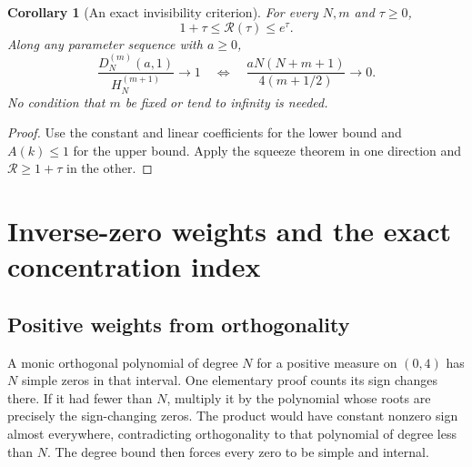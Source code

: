 \documentclass[11pt,a4paper]{article}
\numberwithin{equation}{section}
\newtheorem{corollary}[theorem]{Corollary}
\theoremstyle{definition}
\theoremstyle{remark}
\newcommand{\dd}{\mathrm d}
\newcommand{\Rgs}{\mathcal R}
\begin{document}
\noindent[Merge note: \eqref{gs:eq:repository-coeff} is Part~I's
\eqref{eq:coeff} at $b=1$, since $B=N+m+1$ and $v=m+\frac12$; the
normalization \eqref{gs:eq:Rdef} divides by Part~I's $c_{N,m,0}=H_N^{(m+1)}$.
The measure $\omega$ of \eqref{gs:eq:measure} is Part~I's $\mu_0$
\eqref{eq:measure}, and $x^m\,\dd\omega(x)=\dd\mu_m(x)$; the monic polynomial
$p_N^{(m)}$ is Part~I's \eqref{eq:Jacobi}, whose value at $x=-a$ gives
\eqref{gs:eq:hypergeom}; and \eqref{gs:eq:christoffel} is the one-factor
Christoffel identity for $\mu_m$, of which Part~I's
Lemma~\ref{lem:Christoffel} (for $\mu_0$ and several factors) and its
successors in Parts~II, IV and~V are relatives.  The manuscript re-derives
all three without assuming Part~I.]

\begin{corollary}[An exact invisibility criterion]\label{gs:cor:invisibility}
For every $N,m$ and $\tau\ge0$,
\begin{equation}\label{gs:eq:invisible}
 1+\tau\le\Rgs(\tau)\le e^\tau.
\end{equation}
Along any parameter sequence with $a\ge0$,
\begin{equation}
 \frac{D_N^{(m)}(a,1)}{H_N^{(m+1)}}\longrightarrow1
 \quad\Longleftrightarrow\quad
 \frac{aN(N+m+1)}{4(m+1/2)}\longrightarrow0.
\end{equation}
No condition that $m$ be fixed or tend to infinity is needed.
\end{corollary}
\begin{proof}
Use the constant and linear coefficients for the lower bound and
$A(k)\le1$ for the upper bound. Apply the squeeze theorem in one direction
and $\Rgs\ge1+\tau$ in the other.
\end{proof}

\section{Inverse-zero weights and the exact concentration index}
\label{gs:sec:weights}

\subsection{Positive weights from orthogonality}
A monic orthogonal polynomial of degree $N$ for a positive measure on
$(0,4)$ has $N$ simple zeros in that interval. One elementary proof counts
its sign changes there. If it had fewer than $N$, multiply it by the
polynomial whose roots are precisely the sign-changing zeros. The product
would have constant nonzero sign almost everywhere, contradicting
orthogonality to that polynomial of degree less than $N$.
The degree bound then forces every zero to be simple and internal.
\end{document}
